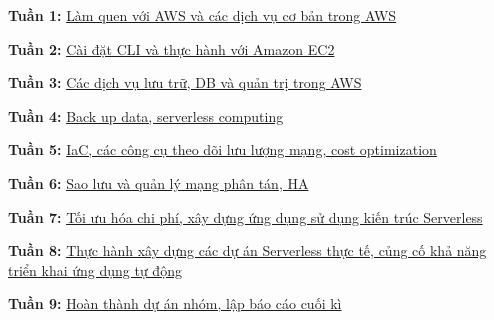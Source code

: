 \textbf{Tuần 1:} \href{1.1-week1/}{Làm quen với AWS và các dịch vụ cơ
bản trong AWS}

\textbf{Tuần 2:} \href{1.2-week2/}{Cài đặt CLI và thực hành với Amazon
EC2}

\textbf{Tuần 3:} \href{1.3-week3/}{Các dịch vụ lưu trữ, DB và quản trị
trong AWS}

\textbf{Tuần 4:} \href{1.4-week4/}{Back up data, serverless computing}

\textbf{Tuần 5:} \href{1.5-week5/}{IaC, các công cụ theo dõi lưu lượng
mạng, cost optimization}

\textbf{Tuần 6:} \href{1.6-week6/}{Sao lưu và quản lý mạng phân tán, HA}

\textbf{Tuần 7:} \href{1.7-week7/}{Tối ưu hóa chi phí, xây dựng ứng dụng
sử dụng kiến trúc Serverless}

\textbf{Tuần 8:} \href{1.8-week8/}{Thực hành xây dựng các dự án
Serverless thực tế, củng cố khả năng triển khai ứng dụng tự động}

\textbf{Tuần 9:} \href{1.9-week9/}{Hoàn thành dự án nhóm, lập báo cáo
cuối kì}
